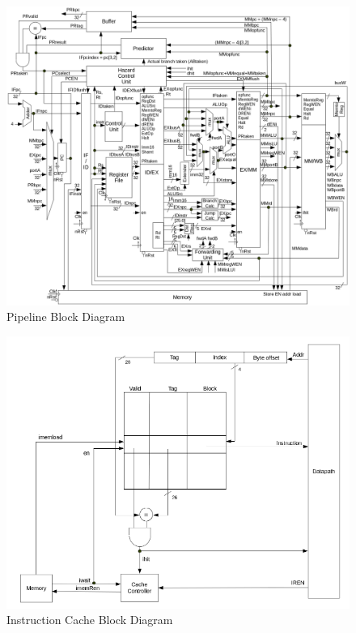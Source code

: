 \documentclass[12pt]{article}
\begin{document}
  \begin{figure}[hbp!]
    \begin{center}
      \includegraphics[width=\textwidth]{diagrams/diagram_pipeline.png}
    \end{center}

    \caption{Pipeline Block Diagram}
		\label{fig:pipeline}
  \end{figure}

  \newpage
  \begin{figure}[hbp!]
    \begin{center}
      \includegraphics[width=.8\textwidth]{diagrams/diagram_icache.png}
    \end{center}

    \caption{Instruction Cache Block Diagram}
		\label{fig:icache}
  \end{figure}
\end{document}
